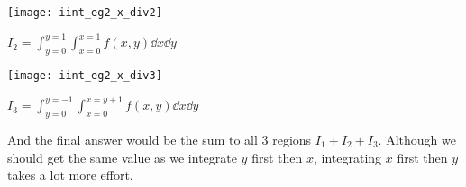 \documentclass[class=article, crop=false, 12pt]{standalone}
\begin{document}
\begin{example}
    \begin{center}
        \begin{minipage}{0.35\textwidth}
            \centering
            \texttt{[image: iint\_eg2\_x\_div2]}
        \end{minipage}
        $\displaystyle I_2 = \int_{y=0}^{y=1}\int_{x=0}^{x=1} f(x,y) \dd{x}\dd{y}$
    \end{center}
        
    \begin{center}
        \begin{minipage}{0.35\textwidth}
            \centering
            \texttt{[image: iint\_eg2\_x\_div3]}
        \end{minipage}
        $\displaystyle I_3 = \int_{y=0}^{y=-1}\int_{x=0}^{x=y+1} f(x,y) \dd{x}\dd{y}$
    \end{center}    


    And the final answer would be the sum to all 3 regions $I_1+I_2+I_3$. 
    Although we should get the same value as we integrate $y$ first then $x$,
    integrating $x$ first then $y$ takes a lot more effort.

\end{example}

\theend
\end{document}
